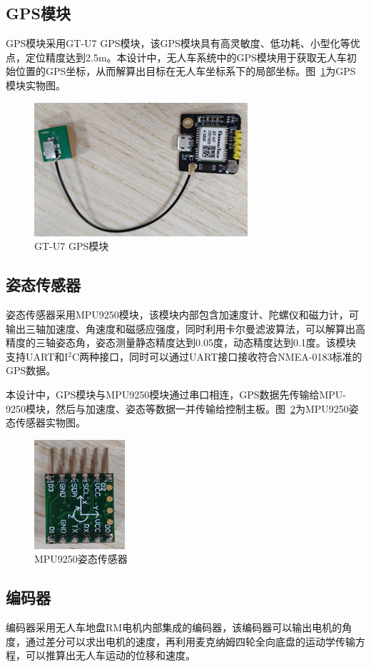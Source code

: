 \subsection{GPS模块}
GPS模块采用GT-U7 GPS模块，该GPS模块具有高灵敏度、低功耗、小型化等优点，定位精度达到2.5m。本设计中，无人车系统中的GPS模块用于获取无人车初始位置的GPS坐标，从而解算出目标在无人车坐标系下的局部坐标。图~\ref{fig:3-6}为GPS模块实物图。

\begin{figure}[htb]
	\centering
	\includegraphics[width=0.4\linewidth]{figures/3-6.png}
	\caption{GT-U7 GPS模块}
	\label{fig:3-6}
\end{figure}

\subsection{姿态传感器}
姿态传感器采用MPU9250模块，该模块内部包含加速度计、陀螺仪和磁力计，可输出三轴加速度、角速度和磁感应强度，同时利用卡尔曼滤波算法，可以解算出高精度的三轴姿态角，姿态测量静态精度达到0.05度，动态精度达到0.1度。该模块支持UART和I$^2$C两种接口，同时可以通过UART接口接收符合NMEA-0183标准的GPS数据。

本设计中，GPS模块与MPU9250模块通过串口相连，GPS数据先传输给MPU-9250模块，然后与加速度、姿态等数据一并传输给控制主板。图~\ref{fig:3-7}为MPU9250姿态传感器实物图。

\begin{figure}[htb]
	\centering
	\includegraphics[width=0.3\linewidth]{figures/3-7.png}
	\caption{MPU9250姿态传感器}
	\label{fig:3-7}
\end{figure}

\subsection{编码器}
编码器采用无人车地盘RM电机内部集成的编码器，该编码器可以输出电机的角度，通过差分可以求出电机的速度，再利用麦克纳姆四轮全向底盘的运动学传输方程，可以推算出无人车运动的位移和速度。

